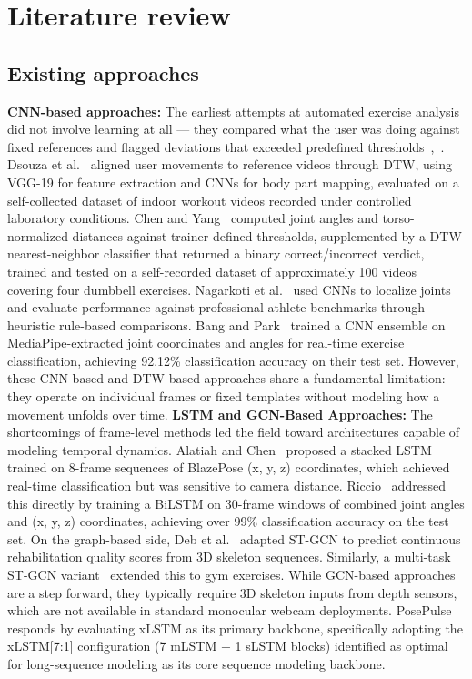 \documentclass[conference,onecolumn,oneside]{IEEEtran}
\begin{document}
\vspace{1.0cm}

\section{Literature review}
\vspace{0.75cm}
\subsection{Existing approaches}
\vspace{0.5cm}
\textbf{CNN-based approaches:}
The earliest attempts at automated exercise analysis did not involve learning at all --- they compared what the user was doing against fixed references and flagged deviations that exceeded predefined thresholds~\cite{9},~\cite{10}. Dsouza et al.~\cite{9} aligned user movements to reference videos through DTW, using VGG-19 for feature extraction and CNNs for body part mapping, evaluated on a self-collected dataset of indoor workout videos recorded under controlled laboratory conditions. Chen and Yang~\cite{10} computed joint angles and torso-normalized distances against trainer-defined thresholds, supplemented by a DTW nearest-neighbor classifier that returned a binary correct/incorrect verdict, trained and tested on a self-recorded dataset of approximately 100 videos covering four dumbbell exercises. Nagarkoti et al.~\cite{11} used CNNs to localize joints and evaluate performance against professional athlete benchmarks through heuristic rule-based comparisons. Bang and Park~\cite{12} trained a CNN ensemble on MediaPipe-extracted joint coordinates and angles for real-time exercise classification, achieving 92.12\% classification accuracy on their test set. However, these CNN-based and DTW-based approaches share a fundamental limitation: they operate on individual frames or fixed templates without modeling how a movement unfolds over time.
\textbf{LSTM and GCN-Based Approaches:}
The shortcomings of frame-level methods led the field toward architectures capable of modeling temporal dynamics. Alatiah and Chen~\cite{13} proposed a stacked LSTM trained on 8-frame sequences of BlazePose (x, y, z) coordinates, which achieved real-time classification but was sensitive to camera distance. Riccio~\cite{1} addressed this directly by training a BiLSTM on 30-frame windows of combined joint angles and (x, y, z) coordinates, achieving over 99\% classification accuracy on the test set.
On the graph-based side, Deb et al.~\cite{14} adapted ST-GCN to predict continuous rehabilitation quality scores from 3D skeleton sequences. Similarly, a multi-task ST-GCN variant~\cite{15} extended this to gym exercises. While GCN-based approaches are a step forward, they typically require 3D skeleton inputs from depth sensors, which are not available in standard monocular webcam deployments. PosePulse responds by evaluating xLSTM \cite{4} as its primary backbone, specifically adopting the xLSTM[7:1] configuration (7 mLSTM + 1 sLSTM blocks) identified as optimal for long-sequence modeling as its core sequence modeling backbone.~\cite{4}
\end{document}
